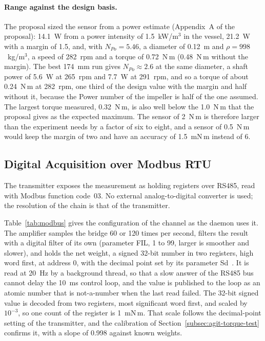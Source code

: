 \paragraph{Range against the design basis.}
The proposal sized the sensor from a power estimate (Appendix~A of the proposal): 14.1~W from a power intensity of 1.5~kW/m$^3$ in the vessel, 21.2~W with a margin of 1.5, and, with $N_{Po} = 5.46$, a diameter of 0.12~m and $\rho = 998$~kg/m$^3$, a speed of 282~rpm and a torque of 0.72~N\,m (0.48~N\,m without the margin). The best 174~mm run gives $N_{Po} \approx 2.6$ at the same diameter, a shaft power of 5.6~W at 265~rpm and 7.7~W at 291~rpm, and so a torque of about 0.24~N\,m at 282~rpm, one third of the design value with the margin and half without it, because the Power number of the impeller is half of the one assumed. The largest torque measured, 0.32~N\,m, is also well below the 1.0~N\,m that the proposal gives as the expected maximum. The sensor of 2~N\,m is therefore larger than the experiment needs by a factor of six to eight, and a sensor of 0.5~N\,m would keep the margin of two and have an accuracy of 1.5~mN\,m instead of 6.

\subsection{Digital Acquisition over Modbus RTU}
\label{subsec:agit-torque-acq}

The transmitter exposes the measurement as holding registers over RS485, read with Modbus function code~03. No external analog-to-digital converter is used; the resolution of the chain is that of the transmitter.

Table~\ref{tab:modbus} gives the configuration of the channel as the daemon uses it. The amplifier samples the bridge 60 or 120 times per second, filters the result with a digital filter of its own (parameter FIL, 1 to 99, larger is smoother and slower), and holds the net weight, a signed 32-bit number in two registers, high word first, at address 0, with the decimal point set by its parameter Sd~\citep{atoman2026,atomodbus2026}. It is read at 20~Hz by a background thread, so that a slow answer of the RS485 bus cannot delay the 10~ms control loop, and the value is published to the loop as an atomic number that is not-a-number when the last read failed. The 32-bit signed value is decoded from two registers, most significant word first, and scaled by $10^{-3}$, so one count of the register is 1~mN\,m. That scale follows the decimal-point setting of the transmitter, and the calibration of Section~\ref{subsec:agit-torque-test} confirms it, with a slope of 0.998 against known weights.


